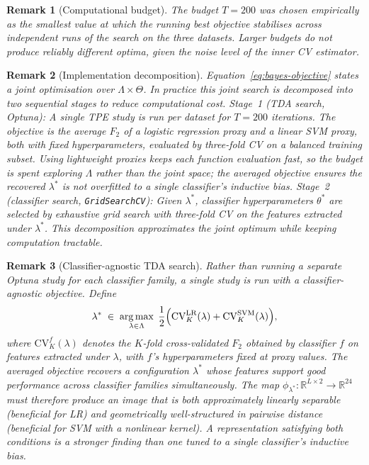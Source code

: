 \documentclass[onluarkali,ingilizce,yukseklisans,karton,LisansustuEgitim]{itutez}
\newtheorem{remark}{Remark}[chapter]
\DeclareMathOperator*{\argmax}{arg\,max}
\providecommand{\R}{\mathbb{R}}
\providecommand{\1}{\mathbf{1}}
\begin{document}
\begin{remark}[Computational budget]
\label{rem:bayes-budget}
The budget $T=200$ was chosen empirically as the smallest value at which the running best objective stabilises across independent runs of the search on the three datasets. Larger budgets do not produce reliably different optima, given the noise level of the inner CV estimator.
\end{remark}

\begin{remark}[Implementation decomposition]
\label{rem:impl-decomp}
Equation~\eqref{eq:bayes-objective} states a joint optimisation over $\Lambda\times\Theta$.
In practice this joint search is decomposed into two sequential stages to reduce
computational cost.
\emph{Stage~1 (TDA search, Optuna):} A single TPE study is run per dataset for
$T=200$ iterations.
The objective is the average $F_2$ of a logistic regression proxy and a linear SVM
proxy, both with fixed hyperparameters, evaluated by three-fold CV on a balanced
training subset.
Using lightweight proxies keeps each function evaluation fast, so the budget is spent
exploring $\Lambda$ rather than the joint space; the averaged objective ensures the
recovered $\lambda^*$ is not overfitted to a single classifier's inductive bias.
\emph{Stage~2 (classifier search, \texttt{GridSearchCV}):} Given $\lambda^*$,
classifier hyperparameters $\theta^*$ are selected by exhaustive grid search with
three-fold CV on the features extracted under $\lambda^*$.
This decomposition approximates the joint optimum while keeping computation tractable.
\end{remark}

\begin{remark}[Classifier-agnostic TDA search]
\label{rem:agnostic-search}
Rather than running a separate Optuna study for each classifier family, a single
study is run with a classifier-agnostic objective.
Define
\[
  \lambda^* \;\in\; \argmax_{\lambda\in\Lambda}\;
  \frac{1}{2}\Bigl(
    \mathrm{CV}_K^{\mathrm{LR}}(\lambda) +
    \mathrm{CV}_K^{\mathrm{SVM}}(\lambda)
  \Bigr),
\]
where $\mathrm{CV}_K^f(\lambda)$ denotes the $K$-fold cross-validated $F_2$ obtained
by classifier $f$ on features extracted under $\lambda$, with $f$'s hyperparameters
fixed at proxy values.
The averaged objective recovers a configuration $\lambda^*$ whose features support
good performance across classifier families simultaneously.
The map $\phi_{\lambda^*}\colon\R^{L\times 2}\to\R^{24}$ must therefore produce an
image that is both approximately linearly separable (beneficial for LR) and
geometrically well-structured in pairwise distance (beneficial for SVM with a
nonlinear kernel).
A representation satisfying both conditions is a stronger finding than one tuned
to a single classifier's inductive bias.
\end{remark}
\end{document}
